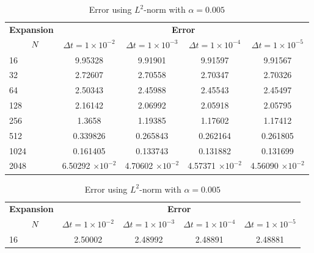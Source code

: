	\begin{table}[H]
	\begin{tabular}{lcccc}
		\toprule
		\multicolumn{1}{c}{\textbf{Expansion}} & \multicolumn{4}{c}{\textbf{Error}} \\
		$\hspace{9mm}N$ & $\Delta t=1\times 10^{-2}$ & $\Delta t=1\times 10^{-3}$ & $\Delta t=1\times 10^{-4}$ & $\Delta t=1\times 10^{-5}$ \\
		\midrule
		\hspace{7mm} 16 & 9.95328   & 9.91901    & 9.91597    & 9.91567    \\
		\midrule
		\hspace{7mm} 32 & 2.72607   & 2.70558    & 2.70347    & 2.70326    \\
		\midrule
		\hspace{7mm} 64 & 2.50343   & 2.45988    & 2.45543    & 2.45497    \\
		\midrule
		\hspace{7mm} 128 & 2.16142   & 2.06992    & 2.05918    & 2.05795    \\
		\midrule
		\hspace{7mm} 256 & 1.3658    & 1.19385    & 1.17602    & 1.17412    \\
		\midrule
		\hspace{7mm} 512 & 0.339826  & 0.265843   & 0.262164   & 0.261805   \\
		\midrule
		\hspace{7mm} 1024 & 0.161405  & 0.133743   & 0.131882   & 0.131699   \\
		\midrule
		\hspace{7mm} 2048 & 6.50292 $\times 10^{-2}$ & 4.70602 $\times 10^{-2}$ & 4.57371 $\times 10^{-2}$  & 4.56090 $\times 10^{-2}$  \\
		\bottomrule
	\end{tabular}
	\caption{Error using $L^2$-norm with $\alpha = 0.005$}
	\label{Galerkin_tabla_L2_alpha=005}
	\vspace{1cm}
	\begin{tabular}{lcccc}
		\toprule
		\multicolumn{1}{c}{\textbf{Expansion}} & \multicolumn{4}{c}{\textbf{Error}} \\
		$\hspace{9mm}N$ & $\Delta t=1\times 10^{-2}$ & $\Delta t=1\times 10^{-3}$ & $\Delta t=1\times 10^{-4}$ & $\Delta t=1\times 10^{-5}$ \\
		\midrule
		\hspace{7mm} 16 & 2.50002  & 2.48992   & 2.48891   & 2.48881   \\

\end{tabular}
\end{table}
